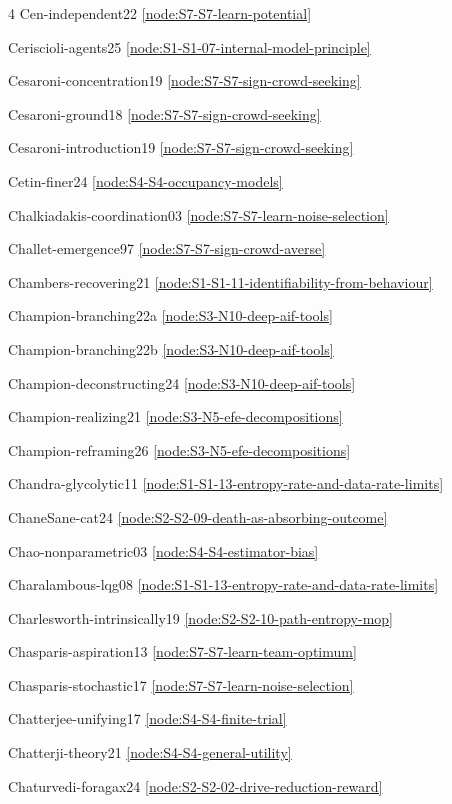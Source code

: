 \documentclass[10pt]{article}
\begin{document}
{\begin{multicols}{4}
Cen-independent22 \hfill \ref{node:S7-S7-learn-potential}\par
Ceriscioli-agents25 \hfill \ref{node:S1-S1-07-internal-model-principle}\par
Cesaroni-concentration19 \hfill \ref{node:S7-S7-sign-crowd-seeking}\par
Cesaroni-ground18 \hfill \ref{node:S7-S7-sign-crowd-seeking}\par
Cesaroni-introduction19 \hfill \ref{node:S7-S7-sign-crowd-seeking}\par
Cetin-finer24 \hfill \ref{node:S4-S4-occupancy-models}\par
Chalkiadakis-coordination03 \hfill \ref{node:S7-S7-learn-noise-selection}\par
Challet-emergence97 \hfill \ref{node:S7-S7-sign-crowd-averse}\par
Chambers-recovering21 \hfill \ref{node:S1-S1-11-identifiability-from-behaviour}\par
Champion-branching22a \hfill \ref{node:S3-N10-deep-aif-tools}\par
Champion-branching22b \hfill \ref{node:S3-N10-deep-aif-tools}\par
Champion-deconstructing24 \hfill \ref{node:S3-N10-deep-aif-tools}\par
Champion-realizing21 \hfill \ref{node:S3-N5-efe-decompositions}\par
Champion-reframing26 \hfill \ref{node:S3-N5-efe-decompositions}\par
Chandra-glycolytic11 \hfill \ref{node:S1-S1-13-entropy-rate-and-data-rate-limits}\par
ChaneSane-cat24 \hfill \ref{node:S2-S2-09-death-as-absorbing-outcome}\par
Chao-nonparametric03 \hfill \ref{node:S4-S4-estimator-bias}\par
Charalambous-lqg08 \hfill \ref{node:S1-S1-13-entropy-rate-and-data-rate-limits}\par
Charlesworth-intrinsically19 \hfill \ref{node:S2-S2-10-path-entropy-mop}\par
Chasparis-aspiration13 \hfill \ref{node:S7-S7-learn-team-optimum}\par
Chasparis-stochastic17 \hfill \ref{node:S7-S7-learn-noise-selection}\par
Chatterjee-unifying17 \hfill \ref{node:S4-S4-finite-trial}\par
Chatterji-theory21 \hfill \ref{node:S4-S4-general-utility}\par
Chaturvedi-foragax24 \hfill \ref{node:S2-S2-02-drive-reduction-reward}\par

\end{multicols}}
\end{document}
